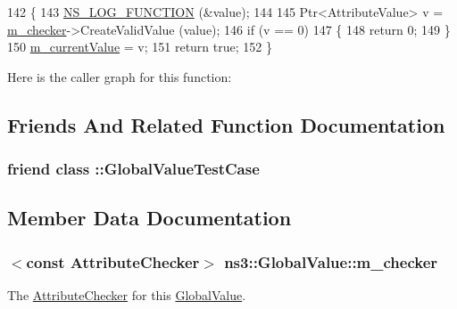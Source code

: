 \begin{DoxyCode}
142 \{
143   \hyperlink{log-macros-disabled_8h_a90b90d5bad1f39cb1b64923ea94c0761}{NS\_LOG\_FUNCTION} (&value);
144 
145   Ptr<AttributeValue> v = \hyperlink{classns3_1_1GlobalValue_aa39ac6dc36430f492a9d25b1d1a7776a}{m\_checker}->CreateValidValue (value);
146   \textcolor{keywordflow}{if} (v == 0)
147     \{
148       \textcolor{keywordflow}{return} 0;
149     \}
150   \hyperlink{classns3_1_1GlobalValue_ac1b6a8c1ae676b1733a5d0c23415e293}{m\_currentValue} = v;
151   \textcolor{keywordflow}{return} \textcolor{keyword}{true};
152 \}
\end{DoxyCode}


Here is the caller graph for this function\+:




\subsection{Friends And Related Function Documentation}
\subsubsection[{\texorpdfstring{\+::\+Global\+Value\+Test\+Case}{::GlobalValueTestCase}}]{\setlength{\rightskip}{0pt plus 5cm}friend class \+::{\bf Global\+Value\+Test\+Case}\hspace{0.3cm}{\ttfamily [friend]}}\hypertarget{classns3_1_1GlobalValue_a0bf24f1ac3f65d68f23db505c74e9a15}{}\label{classns3_1_1GlobalValue_a0bf24f1ac3f65d68f23db505c74e9a15}


\subsection{Member Data Documentation}
\subsubsection[{\texorpdfstring{m\+\_\+checker}{m_checker}}]{$<$const {\bf Attribute\+Checker}$>$ ns3\+::\+Global\+Value\+::m\+\_\+checker\hspace{0.3cm}{\ttfamily [private]}}\hypertarget{classns3_1_1GlobalValue_aa39ac6dc36430f492a9d25b1d1a7776a}{}\label{classns3_1_1GlobalValue_aa39ac6dc36430f492a9d25b1d1a7776a}
The \hyperlink{classns3_1_1AttributeChecker}{Attribute\+Checker} for this \hyperlink{classns3_1_1GlobalValue}{Global\+Value}. 

